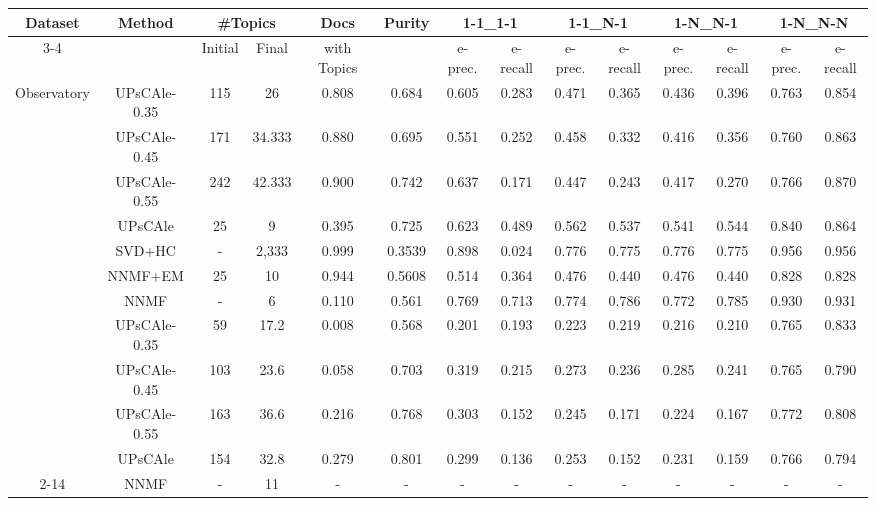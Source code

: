 \begin{table*}
\begin{scriptsize}
\caption{Results obtained by \method compared with 3 baselines}\label{tbl:topics}
\begin{tabular}{|c||c|c|c|c||c|c|c|c|c|c|c|c|c|}
\hline
\multirow{2}{*}{Dataset}&\multirow{2}{*}{Method}&\multicolumn{2}{c|}{\#Topics}&Docs &\multirow{2}{*}{Purity}&\multicolumn{2}{|c|}{1-1\_1-1} &\multicolumn{2}{c|}{1-1\_N-1} &\multicolumn{2}{c|}{1-N\_N-1} &\multicolumn{2}{|c|}{1-N\_N-N}\\ \cline{3-4}\cline{7-14}
         		      &          &     Initial    &      Final       & with Topics    &  & e-prec.   & e-recall          & e-prec.   & e-recall          & e-prec.   & e-recall          & e-prec.   & e-recall          
\\ \hline \hline
\multirow{8}{*}{Observatory} 
 & UPsCAle-0.35 & 115& 26 & 0.808 & 0.684 & 0.605 & 0.283 & 0.471 & 0.365 & 0.436 & 0.396 & 0.763 & 0.854
\\
 & UPsCAle-0.45 & 171 & 34.333 &0.880 & 0.695 & 0.551 & 0.252 & 0.458 & 0.332 & 0.416 & 0.356 & 0.760 & 0.863
\\ 
 & UPsCAle-0.55 & 242& 42.333 & 0.900 & 0.742 & 0.637 & 0.171 & 0.447 & 0.243 & 0.417 & 0.270 & 0.766 & 0.870
\\
 & UPsCAle & 25&9  & 0.395 & 0.725  & 0.623 & 0.489 & 0.562 & 0.537 & 0.541 & 0.544 & 0.840 & 0.864
\\ \cline{2-14}
 & SVD+HC & - &2,333 & 0.999 & 0.3539 & 0.898 & 0.024 & 0.776 & 0.775 & 0.776 & 0.775 & 0.956 & 0.956
\\ 
 & NNMF+EM & 25 &10 &0.944 & 0.5608 & 0.514 & 0.364 & 0.476 & 0.440 & 0.476 & 0.440 & 0.828 & 0.828
\\ 
 & NNMF & - &6 &0.110 & 0.561 & 0.769 & 0.713 & 0.774 & 0.786 & 0.772 & 0.785 & 0.930 & 0.931
\\ \hline	
\multirow{6}{*}{AgNews} 
 & UPsCAle-0.35 & 59&17.2 &0.008 & 0.568 & 0.201 & 0.193 & 0.223 & 0.219 & 0.216 & 0.210 & 0.765 & 0.833
\\ 
 & UPsCAle-0.45 & 103&23.6 &0.058 & 0.703 & 0.319 & 0.215 & 0.273 & 0.236 & 0.285 & 0.241 & 0.765 & 0.790
\\ 
 & UPsCAle-0.55 & 163&36.6 &0.216 & 0.768 & 0.303 & 0.152 & 0.245 & 0.171 & 0.224 & 0.167 & 0.772 & 0.808
 \\
  & UPsCAle &154 &32.8 &0.279 &0.801 & 0.299 & 0.136 & 0.253 & 0.152 & 0.231 & 0.159 & 0.766 & 0.794
\\ \cline{2-14}
 & NNMF & - & 11 & - & - & - & - & - & - & - & - & - & - 
\\ \hline
\end{tabular}


\end{scriptsize}
\end{table*}

